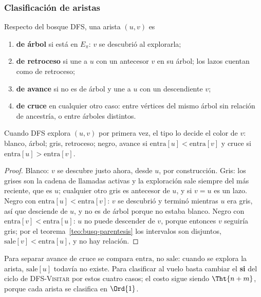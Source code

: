 \documentclass[11pt,letterpaper]{article}
\begin{document}
\subsubsection*{Clasificación de aristas}

\begin{definicion}
  Respecto del bosque DFS, una arista $(u, v)$ es
  \begin{enumerate}[itemsep=0.1em]
    \item \textbf{de árbol} si está en $E_\pi$: $v$ se descubrió al
      explorarla;
    \item \textbf{de retroceso} si une a $u$ con un antecesor $v$ en
      su árbol; los lazos cuentan como de retroceso;
    \item \textbf{de avance} si no es de árbol y une a $u$ con un
      descendiente $v$;
    \item \textbf{de cruce} en cualquier otro caso: entre vértices del
      mismo árbol sin relación de ancestría, o entre árboles
      distintos.
  \end{enumerate}
\end{definicion}

\begin{proposicion}
  \label{prop:busq-clasificacion}
  Cuando DFS explora $(u, v)$ por primera vez, el tipo lo decide el
  color de $v$: blanco, árbol; gris, retroceso; negro, avance si
  $\text{entra}[u] < \text{entra}[v]$ y cruce si
  $\text{entra}[u] > \text{entra}[v]$.
\end{proposicion}

\begin{proof}
  Blanco: $v$ se descubre justo ahora, desde $u$, por construcción.
  Gris: los grises son la cadena de llamadas activas y la exploración
  sale siempre del más reciente, que es $u$; cualquier otro gris es
  antecesor de $u$, y si $v = u$ es un lazo. Negro con
  $\text{entra}[u] < \text{entra}[v]$: $v$ se descubrió y terminó
  mientras $u$ era gris, así que desciende de $u$, y no es de árbol
  porque no estaba blanco. Negro con
  $\text{entra}[v] < \text{entra}[u]$: $u$ no puede descender de $v$,
  porque entonces $v$ seguiría gris; por el
  teorema~\ref{teo:busq-parentesis} los intervalos son disjuntos,
  $\text{sale}[v] < \text{entra}[u]$, y no hay relación.
\end{proof}

Para separar avance de cruce se compara $\text{entra}$, no
$\text{sale}$: cuando se explora la arista, $\text{sale}[u]$ todavía
no existe. Para clasificar al vuelo basta cambiar el \textbf{si} del
ciclo de \textsc{DFS-Visitar} por estos cuatro casos; el costo sigue
siendo $\Tht{n + m}$, porque cada arista se clasifica en $\Ord{1}$.
\end{document}
